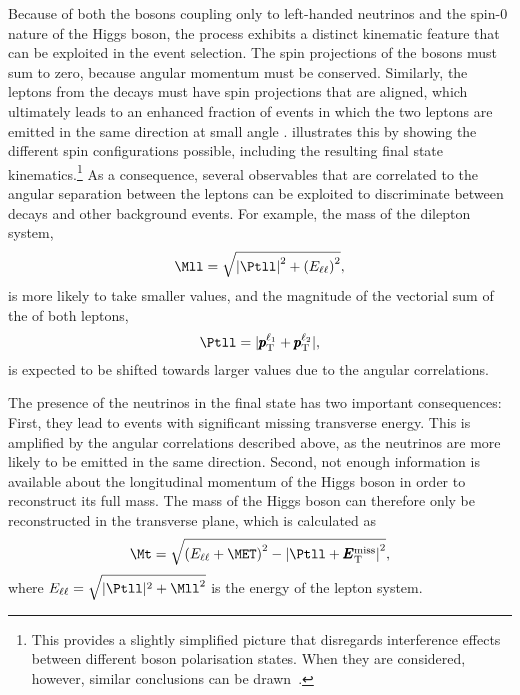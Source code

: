 Because of both the \Wboson bosons coupling only to left-handed neutrinos and the spin-0 nature of the Higgs boson, the \HWWdet process exhibits a distinct kinematic feature that can be exploited in the event selection.
The spin projections of the \Wboson bosons must sum to zero, because angular momentum must be conserved.
Similarly, the leptons from the \Wboson decays must have spin projections that are aligned, which ultimately leads to
an enhanced fraction of \HWWdet events in which the two leptons are emitted in the same direction at small angle \DPhill.
 illustrates this by showing the different spin configurations possible, including the resulting final state kinematics.\footnote{This provides a slightly simplified picture that disregards interference effects between different \Wboson boson polarisation states. When they are considered, however, similar conclusions can be drawn~\cite{Maina_2021}.}
As a consequence, several observables that are correlated to the angular separation between the leptons can be exploited to discriminate between \HWW decays and other background events. For example, the mass of the dilepton system,
\begin{equation}
    \Mll = \sqrt{\left| \Ptll \right|^2+ \left( E_{\ell\ell} \right)^2},
\end{equation}
is more likely to take smaller values, and the magnitude of the vectorial sum of the \pT of both leptons,
\begin{equation}
    \Ptll = |\pmb{p}_\text{T}^{\ell_1} + \pmb{p}_\text{T}^{\ell_2}|,
\end{equation}
is expected to be shifted towards larger values due to the angular correlations. 

The presence of the neutrinos in the final state has two important consequences:
First, they lead to events with significant missing transverse energy. This is amplified by the angular correlations described above, as the neutrinos are more likely to be emitted in the same direction. 
Second, not enough information is available about the longitudinal momentum of the Higgs boson in order to reconstruct its full mass. The mass of the Higgs boson can therefore only be reconstructed in the transverse plane, which is calculated as
\begin{equation}
  \Mt = \sqrt{ \left( E_{\ell\ell}+\MET \right)^2 - \left| \Ptll + \pmb{E}_{\text{T}}^{\text{miss}} \right|^2 },
\end{equation}
where $E_{\ell\ell} = \sqrt{ |\Ptll|^2 + \Mll^2}$ is the energy of the lepton system.


